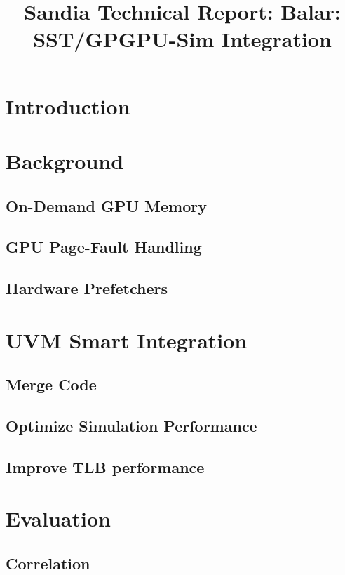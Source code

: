 \documentclass[12pt]{article}
\newcommand{\proptitle}{Sandia Technical Report: Balar: SST/GPGPU-Sim Integration}
\begin{document}

\title{\proptitle}


\newpage


    
\section{Introduction}
    
\section{Background}
    \subsection{On-Demand GPU Memory}
	
    \subsection{GPU Page-Fault Handling}
	
    \subsection{Hardware Prefetchers}
	
\section{UVM Smart Integration}
    \subsection{Merge Code}
        
    \subsection{Optimize Simulation Performance}
        
    \subsection{Improve TLB performance}
        
\section{Evaluation}
    \subsection{Correlation}
        
\end{document}
